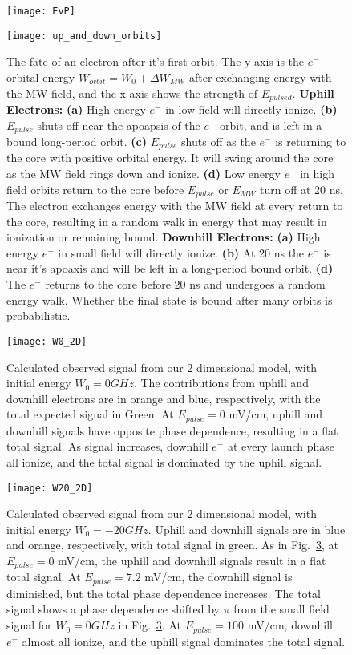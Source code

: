 \documentclass[aps,pra,preprint,groupedaddress]{revtex4-1}
\begin{document}
\begin{figure}
	\texttt{[image: EvP]}
	\caption{}
	\label{fig:EvP}
\end{figure}

\begin{figure}
	\texttt{[image: up\_and\_down\_orbits]}
	\caption{The fate of an electron after it's first orbit. The y-axis is the $e^-$ orbital energy $W_{orbit} = W_0 + \Delta W_{MW}$ after exchanging energy with the MW field, and the x-axis shows the strength of $E_{pulsed}$. \textbf{Uphill Electrons:} \textbf{(a)} High energy $e^-$ in low field will directly ionize. \textbf{(b)} $E_{pulse}$ shuts off near the apoapsis of the $e^-$ orbit, and is left in a bound long-period orbit. \textbf{(c)} $E_{pulse}$ shuts off as the $e^-$ is returning to the core with positive orbital energy. It will swing around the core as the MW field rings down and ionize. \textbf{(d)} Low energy $e^-$ in high field orbits return to the core before $E_{pulse}$ or $E_{MW}$ turn off at 20 ns. The electron exchanges energy with the MW field at every return to the core, resulting in a random walk in energy that may result in ionization or remaining bound. \textbf{Downhill Electrons:} \textbf{(a)} High energy $e^-$ in small field will directly ionize. \textbf{(b)} At 20 ns the $e^-$ is near it's apoaxis and will be left in a long-period bound orbit. \textbf{(d)} The $e^-$ returns to the core before 20 ns and undergoes a random energy walk. Whether the final state is bound after many orbits is probabilistic.}
	\label{fig:orbits}	
\end{figure}

\begin{figure}
	\texttt{[image: W0\_2D]}
	\caption{Calculated observed signal from our 2 dimensional model, with initial energy $W_0 = 0 GHz$. The contributions from uphill and downhill electrons are in orange and blue, respectively, with the total expected signal in Green. At $E_{pulse} = 0$ mV/cm, uphill and downhill signals have opposite phase dependence, resulting in a flat total signal. As signal increases, downhill $e^-$ at every launch phase all ionize, and the total signal is dominated by the uphill signal.}
	\label{fig:2DW0}
\end{figure}

\begin{figure}
	\texttt{[image: W20\_2D]}
	\caption{Calculated observed signal from our 2 dimensional model, with initial energy $W_0 = -20 GHz$. Uphill and downhill signals are in blue and orange, respectively, with total signal in green. As in Fig.~\ref{fig:2DW0}, at $E_{pulse} = 0$ mV/cm, the uphill and downhill signals result in a flat total signal. At $E_{pulse} = 7.2$ mV/cm, the downhill signal is diminished, but the total phase dependence increases. The total signal shows a phase dependence shifted by $\pi$ from the small field signal for $W_0 = 0 GHz$ in Fig.~\ref{fig:2DW0}. At $E_{pulse} = 100$ mV/cm, downhill $e^-$ almost all ionize, and the uphill signal dominates the total signal.}
	\label{fig:2DW20}
\end{figure}
\end{document}
